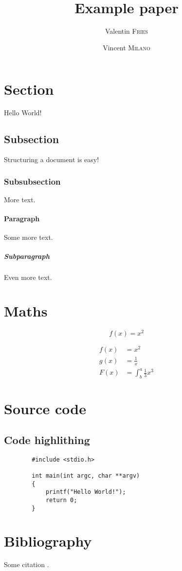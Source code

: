 \documentclass{report}
\title{Example paper}
\author{
    Valentin \textsc{Fries}
    \and
    Vincent \textsc{Milano}
}
\begin{document}
\maketitle

\newpage
\tableofcontents

\newpage
{}

\section{Section}
    Hello World!

    \subsection{Subsection}
    Structuring a document is easy!

        \subsubsection{Subsubsection}
        More text.

        \paragraph{Paragraph}
        Some more text.

            \subparagraph{Subparagraph}
            Even more text.

\section{Maths}
    \begin{equation*}
      f(x) = x^2
    \end{equation*}

    \begin{align*}
      f(x) &= x^2\\
      g(x) &= \frac{1}{x}\\
      F(x) &= \int^a_b \frac{1}{3}x^3
    \end{align*}

\section{Source code}
    \subsection{Code highlithing}
    \begin{lstlisting}
        #include <stdio.h>

        int main(int argc, char **argv)
        {
            printf("Hello World!");
            return 0;
        }
    \end{lstlisting}

\section{Bibliography}
    Some citation \cite{some_reference}.

\newpage



\end{document}
